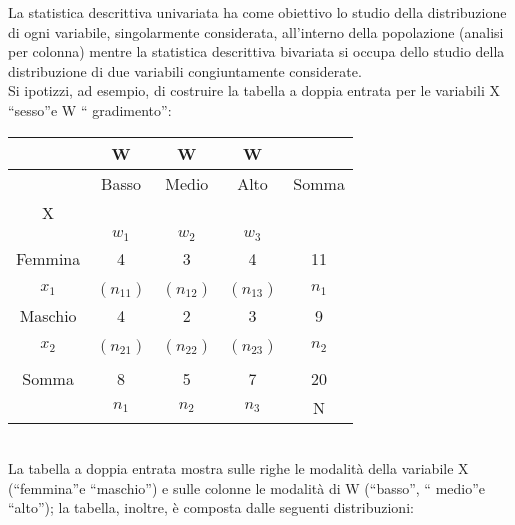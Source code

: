 La statistica descrittiva univariata ha come obiettivo lo studio della 
distribuzione di ogni variabile, singolarmente considerata, all'interno 
della popolazione (analisi per colonna) mentre la statistica descrittiva 
bivariata si occupa dello studio della distribuzione di due variabili 
congiuntamente considerate.\\
Si ipotizzi, ad esempio, di costruire la tabella a doppia entrata per le 
variabili X \textquotedblleft sesso\textquotedblright e W \textquotedblleft 
gradimento\textquotedblright:

\begin{tabular}{|c|c|c|c|c|}
\hline
 & W & W & W & \\
\hline
 & Basso & Medio & Alto & Somma\\
X &  & & &\\
 & $w_1$ & $w_2$ &  $w_3$ & \\
 \hline
 Femmina & 4 & 3 & 4 & 11\\
   &  & & &\\
 $x_1$ & $(n_{11})$ & $(n_{12})$ &  $(n_{13})$ & $n_1$ \\
  \hline
   Maschio & 4 & 2 & 3 & 9\\
   &  & & &\\
   $x_2$ & $(n_{21})$ & $(n_{22})$ &  $(n_{23})$ & $n_2$ \\
   \hline
 &  &  &  & \\
 Somma  & 8 & 5& 7&20\\
    & $n_{1}$ & $n_{2}$ &  $n_{3}$ & N \\   
  
  \hline
\end{tabular}
\\La tabella a doppia entrata mostra sulle righe le modalità della 
variabile X (\textquotedblleft femmina\textquotedblright e 
\textquotedblleft maschio\textquotedblright) e sulle colonne le modalità di 
W (\textquotedblleft basso\textquotedblright, \textquotedblleft 
medio\textquotedblright e \textquotedblleft alto\textquotedblright); la 
tabella, inoltre, è composta dalle seguenti distribuzioni:      
